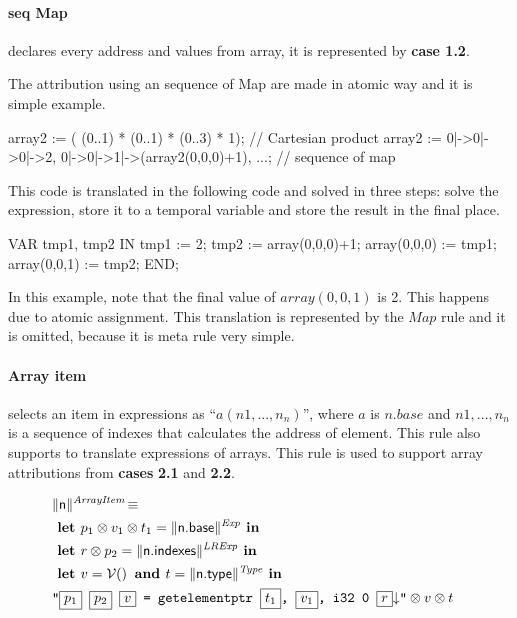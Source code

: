 \paragraph{seq Map} declares every address and values from array, it is represented by \textbf{case 1.2}.

The attribution using an sequence of Map are made in atomic way and it is simple example.


\begin{pascalcode}
 array2 := ( (0..1) * (0..1) * (0..3) * {1}); // Cartesian product
 array2 := { 0|->0|->0|->2, 0|->0|->1|->(array2(0,0,0)+1), ...}; // sequence of map
\end{pascalcode}

This code is translated in the following code and solved in three steps: solve 
the expression, store it to a temporal variable and  store the result in the 
final place.

\begin{pascalcode}
VAR tmp1, tmp2 IN
tmp1 := 2;
tmp2 := array(0,0,0)+1;
array(0,0,0) := tmp1;
array(0,0,1) := tmp2;
END;
\end{pascalcode}

In this example, note that the final value of $array(0,0,1)$ is 2. This 
happens due to atomic assignment. This translation is represented by the 
$Map$ rule and it is omitted, because it is meta rule very simple.


\paragraph{Array item} selects an item in expressions as ``$a(n1,...,n_{n})$'', 
where $a$ is $n.base$ and $n1,...,n_{n}$ is a sequence of indexes that 
calculates the address of element. This rule also supports to translate 
expressions of arrays. This rule is used to support array attributions 
from \textbf{cases} \textbf{2.1} and \textbf{2.2}.

\begin{align*}
\lefteqn{\trad{n}{ArrayItem} \isdef} \\
&  \LET p_1 \sep v_1 \sep t_1  = \trad{n.base}{Exp}  \IN \\
&  \LET r \sep p_2  = \trad{n.indexes}{LRExp}  \IN \\
&  \LET v =  \variable \AND  t = \trad{\B{n.type}}{Type}  \IN \\
&  \llvm{"\PH{p_1} \PH{p_2} \PH{v} =  getelementptr \PH{t_1}, \PH{v_1}, i32 0 \PH{r}\nl"}  \sep v \sep t\\
\end{align*}

